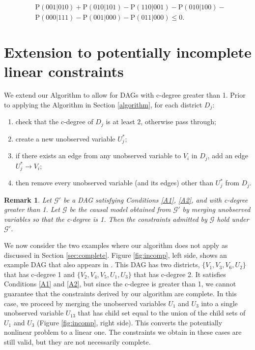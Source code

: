 \documentclass[12pt]{article}
\newtheorem{remark}{Remark}
\def\Pr{{\mathrm{P}}}
\begin{document}
\begin{align*}
& \Pr(001|010) + \Pr(010|101) - \Pr(110|001) - \Pr(010|100) - \\
& \Pr(000|111) - \Pr(001|000) - \Pr(011|000) \leq 0.
\end{align*}




\section{Extension to potentially incomplete linear constraints}
\label{sec:nonlin}
We extend our Algorithm to allow for DAGs with c-degree greater than 1. Prior to applying the Algorithm in Section \ref{algorithm}, for each district $D_j$:
\begin{enumerate}
    \item check that the c-degree of $D_j$ is at least $2$, otherwise pass through;
    \item create a new unobserved variable $U_j^*$; 
    \item if there exists an edge from any unobserved variable to $V_i$ in $D_j$, add an edge $U_j^* \rightarrow V_i$;
    \item then remove every unobserved variable (and its edges) other than $U_j^*$ from $D_j$. 
\end{enumerate}

\begin{remark}
\label{prop:merge}
Let $\mathcal{G}'$ be a DAG satisfying Conditions \ref{A1}, \ref{A2}, and with c-degree greater than 1. Let $\mathcal{G}$ be the causal model obtained from $\mathcal{G}'$ by merging unobserved variables so that the c-degree is 1. 
Then the constraints admitted by $\mathcal{G}$ hold under $\mathcal{G}'$.
\end{remark}

We now consider the two examples where our algorithm does not apply as discussed in Section \ref{sec:complete}.
Figure \ref{fig:incomp}, left side, shows an example DAG that also appears in  \citet{duarte2023automated}. This DAG has two districts, $\{V_1, V_3, V_6, U_2\}$ that has c-degree 1 and $\{V_2, V_4, V_5, U_1, U_3\}$ that has c-degree 2. It satisfies Conditions \ref{A1} and \ref{A2}, but since the c-degree is greater than 1, we cannot guarantee that the constraints derived by our algorithm are complete. In this case, we proceed by merging the unobserved variables $U_1$ and $U_3$ into a single unobserved variable $U_{13}$ that has child set equal to the union of the child sets of $U_1$ and $U_3$ (Figure \ref{fig:incomp}, right side). This converts the potentially nonlinear problem to a linear one. The constraints we obtain in these cases are still valid, but they are not necessarily complete. 
\end{document}
